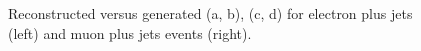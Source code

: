 \begin{figure}[hbtp]
	\centering
	\hfill
	\\
	\hfill
	\\

	\caption{Reconstructed versus generated \WPT (a, b), \MT (c, d) for electron plus jets (left) and muon plus jets
	events (right).}
	\label{fig:choice_of_bins_2}
 \end{figure}

